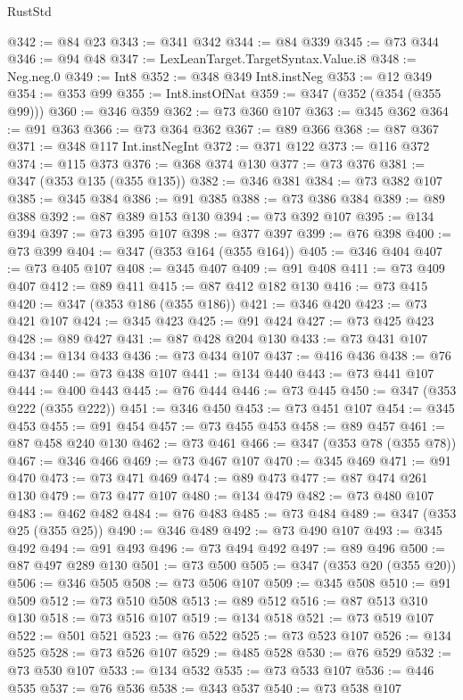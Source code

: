 \begin{lexlean}{RustStd}
\begin{coremodule}
@342 := @84 @23
@343 := @341 @342
@344 := @84 @339
@345 := @73 @344
@346 := @94 @48
@347 := LexLeanTarget.TargetSyntax.Value.i8
@348 := Neg.neg.{0}
@349 := Int8
@352 := @348 @349 Int8.instNeg
@353 := @12 @349
@354 := @353 @99
@355 := Int8.instOfNat
@359 := @347 (@352 (@354 (@355 @99)))
@360 := @346 @359
@362 := @73 @360 @107
@363 := @345 @362
@364 := @91 @363
@366 := @73 @364 @362
@367 := @89 @366
@368 := @87 @367
@371 := @348 @117 Int.instNegInt
@372 := @371 @122
@373 := @116 @372
@374 := @115 @373
@376 := @368 @374 @130
@377 := @73 @376
@381 := @347 (@353 @135 (@355 @135))
@382 := @346 @381
@384 := @73 @382 @107
@385 := @345 @384
@386 := @91 @385
@388 := @73 @386 @384
@389 := @89 @388
@392 := @87 @389 @153 @130
@394 := @73 @392 @107
@395 := @134 @394
@397 := @73 @395 @107
@398 := @377 @397
@399 := @76 @398
@400 := @73 @399
@404 := @347 (@353 @164 (@355 @164))
@405 := @346 @404
@407 := @73 @405 @107
@408 := @345 @407
@409 := @91 @408
@411 := @73 @409 @407
@412 := @89 @411
@415 := @87 @412 @182 @130
@416 := @73 @415
@420 := @347 (@353 @186 (@355 @186))
@421 := @346 @420
@423 := @73 @421 @107
@424 := @345 @423
@425 := @91 @424
@427 := @73 @425 @423
@428 := @89 @427
@431 := @87 @428 @204 @130
@433 := @73 @431 @107
@434 := @134 @433
@436 := @73 @434 @107
@437 := @416 @436
@438 := @76 @437
@440 := @73 @438 @107
@441 := @134 @440
@443 := @73 @441 @107
@444 := @400 @443
@445 := @76 @444
@446 := @73 @445
@450 := @347 (@353 @222 (@355 @222))
@451 := @346 @450
@453 := @73 @451 @107
@454 := @345 @453
@455 := @91 @454
@457 := @73 @455 @453
@458 := @89 @457
@461 := @87 @458 @240 @130
@462 := @73 @461
@466 := @347 (@353 @78 (@355 @78))
@467 := @346 @466
@469 := @73 @467 @107
@470 := @345 @469
@471 := @91 @470
@473 := @73 @471 @469
@474 := @89 @473
@477 := @87 @474 @261 @130
@479 := @73 @477 @107
@480 := @134 @479
@482 := @73 @480 @107
@483 := @462 @482
@484 := @76 @483
@485 := @73 @484
@489 := @347 (@353 @25 (@355 @25))
@490 := @346 @489
@492 := @73 @490 @107
@493 := @345 @492
@494 := @91 @493
@496 := @73 @494 @492
@497 := @89 @496
@500 := @87 @497 @289 @130
@501 := @73 @500
@505 := @347 (@353 @20 (@355 @20))
@506 := @346 @505
@508 := @73 @506 @107
@509 := @345 @508
@510 := @91 @509
@512 := @73 @510 @508
@513 := @89 @512
@516 := @87 @513 @310 @130
@518 := @73 @516 @107
@519 := @134 @518
@521 := @73 @519 @107
@522 := @501 @521
@523 := @76 @522
@525 := @73 @523 @107
@526 := @134 @525
@528 := @73 @526 @107
@529 := @485 @528
@530 := @76 @529
@532 := @73 @530 @107
@533 := @134 @532
@535 := @73 @533 @107
@536 := @446 @535
@537 := @76 @536
@538 := @343 @537
@540 := @73 @538 @107

\end{coremodule}
\end{lexlean}
